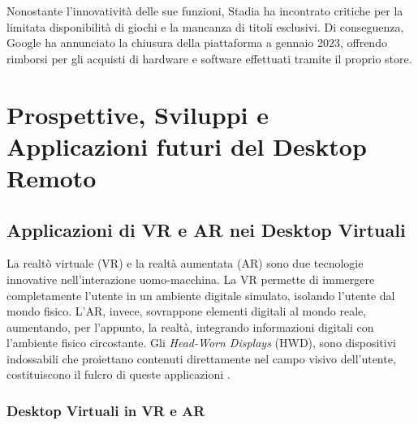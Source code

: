 \documentclass[12pt,a4paper,openright,twoside]{book}
\begin{document}
Nonostante l'innovatività delle sue funzioni, Stadia ha incontrato critiche per la limitata disponibilità di giochi e la mancanza di titoli esclusivi. Di conseguenza, Google ha annunciato la chiusura della piattaforma a gennaio 2023, offrendo rimborsi per gli acquisti di hardware e software effettuati tramite il proprio store.




\chapter{Prospettive, Sviluppi e Applicazioni futuri del Desktop Remoto}


\section{Applicazioni di VR e AR nei Desktop Virtuali}

La realtò virtuale (VR) e la realtà aumentata (AR) sono due tecnologie innovative nell'interazione uomo-macchina. La VR permette di immergere completamente l'utente in un ambiente digitale simulato, isolando l'utente dal mondo fisico. L'AR, invece, sovrappone elementi digitali al mondo reale, aumentando, per l'appunto, la realtà, integrando informazioni digitali con l'ambiente fisico circostante. Gli \textit{Head-Worn Displays} (HWD), sono dispositivi indossabili che proiettano contenuti direttamente nel campo visivo dell'utente, costituiscono il fulcro di queste applicazioni \cite{pavanatto2021, frontiers2023}.

\subsection{Desktop Virtuali in VR e AR}
\end{document}

